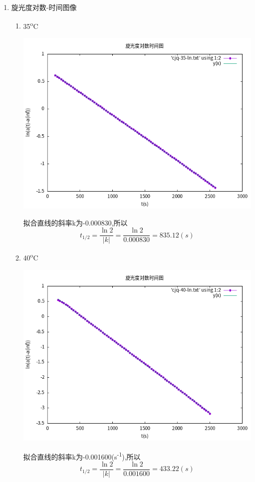 \documentclass[11pt]{report}
\begin{document}
\begin{enumerate}
\begin{enumerate}
\begin{enumerate}
\begin{center}
\end{center}
\end{enumerate}
\item 旋光度对数-时间图像
\label{sec:orgb40f77c}
\begin{enumerate}
\item 35\textsuperscript{o}C
\label{sec:org0907b29}
\begin{center}
\includegraphics[width=.9\linewidth]{../data/cjq-35-ln.png}
\end{center}
拟合直线的斜率k为-0.000830,所以
\[
t_{1/2}=\frac{\ln 2}{|k|}=\frac{\ln 2}{0.000830}=835.12(s)
\]
\item 40\textsuperscript{o}C
\label{sec:orgb0cfb86}
\begin{center}
\includegraphics[width=.9\linewidth]{../data/cjq-40-ln.png}
\end{center}
拟合直线的斜率k为-0.001600(s\textsuperscript{-1}),所以
\[
t_{1/2}=\frac{\ln 2}{|k|}=\frac{\ln 2}{0.001600}=433.22(s)
\]
\end{enumerate}


\end{enumerate}
\end{enumerate}
\end{document}
